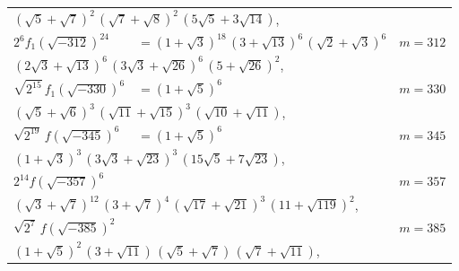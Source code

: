 \documentclass[12pt,a4paper]{article}
\begin{document}
\begin{longtable}{@{}llr@{}}
\multicolumn{3}{l}{\qquad$(\sqrt{5}+\sqrt{7})^2\,(\sqrt{7}+\sqrt{8})^2\,(5\sqrt{5}+3\sqrt{14})$,} \\
$2^6f_1(\sqrt{-312})^{24}$ &$= (1+\sqrt{3})^{18}\,(3+\sqrt{13})^6\,(\sqrt{2}+\sqrt{3})^6$ & $m=312$ \\
\multicolumn{3}{l}{\qquad$(2\sqrt{3}+\sqrt{13})^6\,(3\sqrt{3}+\sqrt{26})^6\,(5+\sqrt{26})^2$,} \\
$\sqrt{2^{15}}\,f_1(\sqrt{-330})^6$ &$= (1+\sqrt{5})^6$ & $m=330$ \\
\multicolumn{3}{l}{\qquad$(\sqrt{5}+\sqrt{6})^3\,(\sqrt{11}+\sqrt{15})^3\,(\sqrt{10}+\sqrt{11})$,} \\
$\sqrt{2^{19}}\,f(\sqrt{-345})^6$ &$= (1+\sqrt{5})^6$ & $m=345$ \\
\multicolumn{3}{l}{\qquad$(1+\sqrt{3})^3\,(3\sqrt{3}+\sqrt{23})^3\,(15\sqrt{5}+7\sqrt{23})$,} \\
$2^{14}f(\sqrt{-357})^6$ & & $m=357$ \\
\multicolumn{3}{l}{\qquad$(\sqrt{3}+\sqrt{7})^{12}\,(3+\sqrt{7})^4\,(\sqrt{17}+\sqrt{21})^3\,(11+\sqrt{119})^2$,} \\
$\sqrt{2^7}\,f(\sqrt{-385})^2$ & & $m=385$ \\
\multicolumn{3}{l}{\qquad$(1+\sqrt{5})^2\,(3+\sqrt{11})\,(\sqrt{5}+\sqrt{7})\,(\sqrt{7}+\sqrt{11})$,} \\
\bottomrule
\end{longtable}

\newpage
\setcounter{page}{726}
\end{document}
